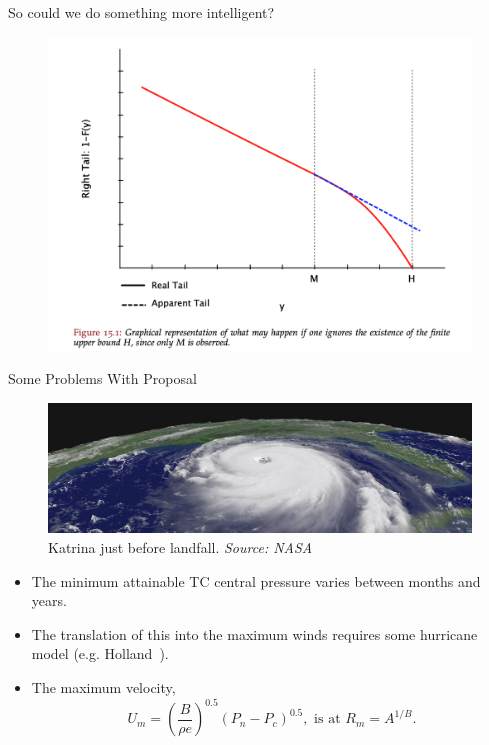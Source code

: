 \begin{frame}{So could we do something more intelligent?~\cite{taleb2019statistical}}
\vspace{-20pt}
 \begin{minipage}{1.0\textwidth}
\begin{figure}[htb!]
    \centering
    \includegraphics[width=1\linewidth]{images/nnt-upper-bound.png}
    \vspace{-15pt}

\end{figure}
\end{minipage}
\end{frame}

\begin{frame}{Some Problems With Proposal}
\begin{figure}
\includegraphics[width=\linewidth]{images/NASA-KATRINA-SIDEON.jpg}\\
Katrina just before landfall. \textit{Source: NASA}
\end{figure}
\begin{itemize}
\item The minimum attainable TC central pressure varies between months and years.
\item The translation of this into the maximum winds requires some hurricane model
    (e.g. Holland~\cite{holland1980analytic, holland2010revised}).
\item
    The maximum velocity,
    \begin{equation}
    U_m = (\frac{B}{\rho e})^{0.5}(P_n-P_c)^{0.5}, \text{ is at }
    R_m = A^{1/B}.
    \end{equation}
\end{itemize}
\end{frame}


